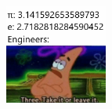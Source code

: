 \documentclass{article}
\begin{document}



\begin{figure}[h]
  \centering
  \includegraphics[width=0.3\textwidth]{meme.png}
\end{figure}
\end{document}
